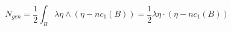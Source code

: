 \begin{equation}
\label{Ngen}
N_{gen} = \frac{1}{2} \int_{B} \lambda \eta \wedge (\eta - n c_{1}(B))
        = \frac{1}{2} \lambda \eta \cdot ( \eta - n c_{1}(B) )
\end{equation}

